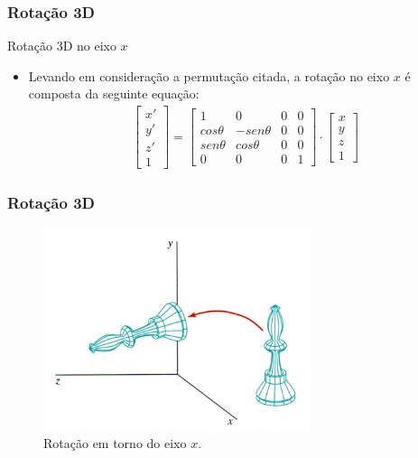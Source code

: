 \documentclass{beamer}
\begin{document}
\begin{frame}
\frametitle{Rotação 3D}

	\begin{block}{Rotação 3D no eixo $x$}
		\begin{itemize}
			\item Levando em consideração a permutação citada, a rotação no eixo $x$ é composta da seguinte equação:\\
			\begin{eqnarray*}
				\begin{bmatrix}
					x' \\
					y' \\
					z' \\
					1
				\end{bmatrix} = 
				\begin{bmatrix}
					1			& 0				& 0 & 0 \\
					cos \theta	& -sen \theta	& 0 & 0 \\
					sen \theta	& cos \theta		& 0 & 0 \\
					0			& 0				& 0	& 1
				\end{bmatrix}
				\cdot \begin{bmatrix}
					x \\
					y \\
					z \\
					1
				\end{bmatrix}
			\end{eqnarray*}
		\end{itemize}
	\end{block}
	
\end{frame}

\begin{frame}
\frametitle{Rotação 3D}


	\begin{figure}[!h]
			\begin{center}
			\includegraphics[width=0.7\textwidth]{Figures/rx}
			\caption{Rotação em torno do eixo $x$.}
			\end{center}
	\end{figure}
	
\end{frame}
\end{document}
